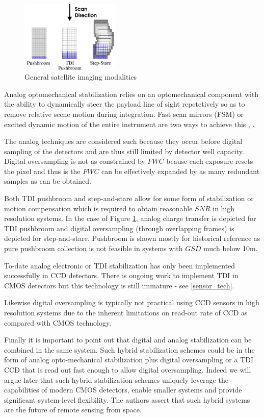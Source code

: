 \documentclass[10pt,journal]{IEEEtran}  %
\begin{document}
\begin{figure}[h!t]
\includegraphics[width=0.42\textwidth]{figures/modalities.png}
\caption{General satellite imaging modalities}
\label{fig:modalities}
\end{figure}

Analog optomechanical stabilization relies on an optomechanical component with the ability to dynamically steer the payload line of sight repetetively so as to remove relative scene motion during integration.  Fast scan mirrors (FSM) or excited dynamic motion of the entire instrument are two ways to achieve this \cite{patent:jonny}, \cite{patent:dirk}.

The analog techniques are considered such because they occur before digital sampling of the detectors and are thus still limited by detector well capacity.  Digital oversampling is not as constrained by $FWC$ beause each exposure resets the pixel and thus is the $FWC$ can be effectively expanded by as many redundant samples as can be obtained.

Both TDI pushbroom and step-and-stare allow for some form of stabilization or motion compensation which is required to obtain reasonable $SNR$ in high resolution systems.  In the case of Figure \ref{fig:modalities}, analog charge transfer is depicted for TDI pushbroom and digital oversampling (through overlapping frames) is depicted for step-and-stare.  Pushbroom is shown mostly for historical reference as pure pushbroom collection is not feasible in systems with $GSD$ much below 10m.

To-date analog electronic or TDI stabilization has only been implemented successfully in CCD detectors.  There is ongoing work to implement TDI in CMOS detectors but this technology is still immature - see \ref{sensor_tech}.  

Likewise digital oversampling is typically not practical using CCD sensors in high resolution systems due to the inherent limitations on read-out rate of CCD as compared with CMOS technology.

Finally it is important to point out that digital and analog stabilization can be combined in the same system.  Such hybrid stabilization schemes could be in the form of analog opto-mechanical stabilization plus digital oversampling or a TDI CCD that is read out fast enough to allow digital oversampling.  Indeed we will argue later that such hybrid stabilization schemes uniquely leverage the capabilities of modern CMOS detectors, enable smaller systems and provide significant system-level flexibility.  The authors assert that such hybrid systems are the future of remote sensing from space.
\end{document}
